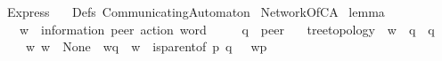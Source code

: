%
\begin{isabellebody}%
%
%
\isadelimtheory
\isanewline
\isanewline
%
\endisadelimtheory
%
\isatagtheory
{}\isamarkupfalse%
\ Express\isanewline
\ \ \ Defs\ CommunicatingAutomaton\isanewline
\isanewline
{}%
\endisatagtheory
{\isafoldtheory}%
%
\isadelimtheory
\isanewline
%
\endisadelimtheory
\isanewline
{}\isamarkupfalse%
\ NetworkOfCA\isanewline
{}%
\isadelimdocument
%
\endisadelimdocument
%
\isatagdocument
%
\isamarkuptrue%
%
\endisatagdocument
{\isafolddocument}%
%
\isadelimdocument
%
\endisadelimdocument
{}\isamarkupfalse%
\ lemma{}{\isacharunderscore}{\kern0pt}{}\ {\isacharcolon}{\kern0pt}\ \isanewline
\ \ \ w\ {\isacharcolon}{\kern0pt}{\isacharcolon}{\kern0pt}\ {\isachardoublequoteopen}{\isacharparenleft}{\kern0pt}{\isacharprime}{\kern0pt}information{\isacharcomma}{\kern0pt}\ {\isacharprime}{\kern0pt}peer{\isacharparenright}{\kern0pt}\ action\ word{\isachardoublequoteclose}\isanewline
\ \ \ \ \ q\ {\isacharcolon}{\kern0pt}{\isacharcolon}{\kern0pt}\ {\isachardoublequoteopen}{\isacharprime}{\kern0pt}peer{\isachardoublequoteclose}\isanewline
\ \ \ {\isachardoublequoteopen}tree{\isacharunderscore}{\kern0pt}topology{\isachardoublequoteclose}\ \ {\isachardoublequoteopen}w\ {\isasymin}\ {\isasymL}\isactrlsup {\isacharasterisk}{\kern0pt}{\isacharparenleft}{\kern0pt}q{\isacharparenright}{\kern0pt}{\isachardoublequoteclose}\ \ {\isachardoublequoteopen}q\ {\isasymin}\ {\isasymP}{\isachardoublequoteclose}\isanewline
\ \ \ {\isachardoublequoteopen}{\isasymexists}\ w{\isacharprime}{\kern0pt}{\isachardot}{\kern0pt}\ {\isacharparenleft}{\kern0pt}w{\isacharprime}{\kern0pt}\ {\isasymin}\ {\isasymT}\isactrlbsub None\isactrlesub \ {\isasymand}\ w{\isacharprime}{\kern0pt}{\isasymdown}\isactrlsub q\ {\isacharequal}{\kern0pt}\ w\ {\isasymand}\ {\isacharparenleft}{\kern0pt}{\isacharparenleft}{\kern0pt}is{\isacharunderscore}{\kern0pt}parent{\isacharunderscore}{\kern0pt}of\ p\ q{\isacharparenright}{\kern0pt}\ {\isasymlongrightarrow}\ \ w{\isacharprime}{\kern0pt}{\isasymdown}\isactrlsub p\ {\isacharequal}{\kern0pt}\ {\isasymepsilon}{\isacharparenright}{\kern0pt}{\isacharparenright}{\kern0pt}{\isachardoublequoteclose}\isanewline
\ \ \ \ \isanewline
%
\isadelimproof
\ \ %
\endisadelimproof
%
\isatagproof

\end{isabellebody}
